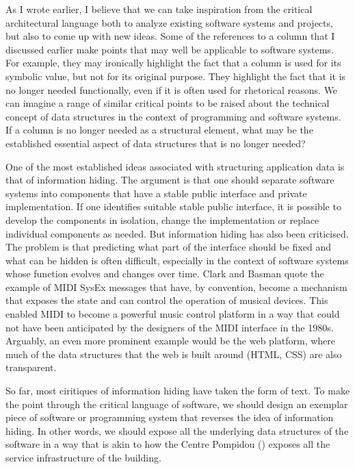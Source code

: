 As I wrote earlier, I believe that we can take inspiration from the critical architectural
language both to analyze existing software systems and projects, but also to come up with
new ideas. Some of the references to a column that I discussed earlier make points that
may well be applicable to software systems. For example, they may ironically highlight the fact
that a column is used for its symbolic value, but not for its original purpose.
They highlight the fact that it is no longer needed functionally, even if it is often used
for rhetorical reasons.
We can imagine a range of similar critical points to be raised about the technical concept
of data structures in the context of programming and software systems. If a column is no longer
needed as a structural element, what may be the established essential aspect of data structures
that is no longer needed?

One of the most established ideas associated with structuring application data is that of
information hiding.
The argument is that one should separate software systems into components that have a stable
public interface and private implementation. If one identifies suitable stable public interface,
it is possible to develop the components in isolation, change the implementation or replace
individual components as needed. But information hiding has also been criticised. The problem is
that predicting what part of the interface should be fixed and what can be hidden is often
difficult, especially in the context of software systems whose function evolves and changes
over time. Clark and Basman quote the example of MIDI SysEx messages that
have, by convention, become a mechanism that exposes the state and can control the operation
of musical devices. This enabled MIDI to become a powerful music control platform in a way
that could not have been anticipated by the designers of the MIDI interface in the 1980s.
Arguably, an even more prominent example would be the web platform, where much of the data
structures that the web is built around (HTML, CSS) are also transparent.

So far, most ciritiques of information hiding have taken the form of text. To make the point
through the critical language of software, we should design an exemplar piece of software
or programming system that reverses the idea of information hiding. In other words, we
should expose all the underlying data structures of the software in a way that is akin to how
the Centre Pompidou () exposes all the service infrastructure of the
building.

